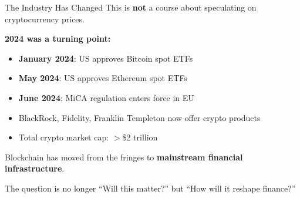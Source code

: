\documentclass[10pt]{beamer}
\newcommand{\highlight}[1]{\textcolor{AccentOrange}{\textbf{#1}}}
\begin{document}
\begin{frame}{The Industry Has Changed}
  This is \highlight{not} a course about speculating on cryptocurrency prices.
  
  \vspace{1em}
  \textbf{2024 was a turning point:}
  \begin{itemize}
    \item \textbf{January 2024}: US approves Bitcoin spot ETFs
    \item \textbf{May 2024}: US approves Ethereum spot ETFs
    \item \textbf{June 2024}: MiCA regulation enters force in EU
    \item BlackRock, Fidelity, Franklin Templeton now offer crypto products
    \item Total crypto market cap: $>$\$2 trillion
  \end{itemize}
  
  \vspace{1em}
  Blockchain has moved from the fringes to \highlight{mainstream financial infrastructure}.
  
  \vspace{0.5em}
  The question is no longer ``Will this matter?'' but ``How will it reshape finance?''
\end{frame}
\end{document}
